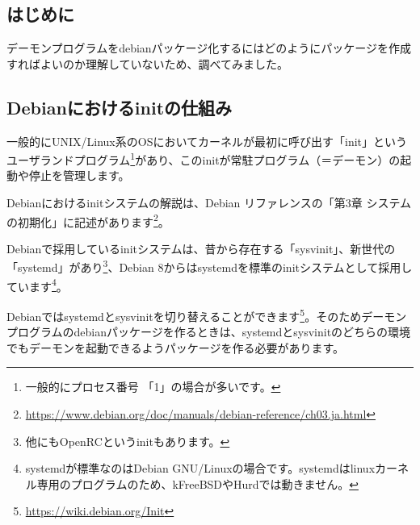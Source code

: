 \documentclass[mingoth,a4paper]{jsarticle}
\begin{document}
%
%
%
%




\subsection{はじめに}

デーモンプログラムをdebianパッケージ化するにはどのようにパッケージを作成すればよいのか理解していないため、調べてみました。


\subsection{Debianにおけるinitの仕組み}

一般的にUNIX/Linux系のOSにおいてカーネルが最初に呼び出す「init」というユーザランドプログラム\footnote{一般的にプロセス番号 「1」の場合が多いです。}があり、このinitが常駐プログラム（＝デーモン）の起動や停止を管理します。


Debianにおけるinitシステムの解説は、Debian リファレンスの「第3章 システムの初期化」に記述があります\footnote{\url{https://www.debian.org/doc/manuals/debian-reference/ch03.ja.html}}。

Debianで採用しているinitシステムは、昔から存在する「sysvinit」、新世代の「systemd」があり\footnote{他にもOpenRCというinitもあります。}、Debian 8からはsystemdを標準のinitシステムとして採用しています\footnote{systemdが標準なのはDebian GNU/Linuxの場合です。systemdはlinuxカーネル専用のプログラムのため、kFreeBSDやHurdでは動きません。}。


Debianではsystemdとsysvinitを切り替えることができます\footnote{\url{https://wiki.debian.org/Init}}。そのためデーモンプログラムのdebianパッケージを作るときは、systemdとsysvinitのどちらの環境でもデーモンを起動できるようパッケージを作る必要があります。
\end{document}
